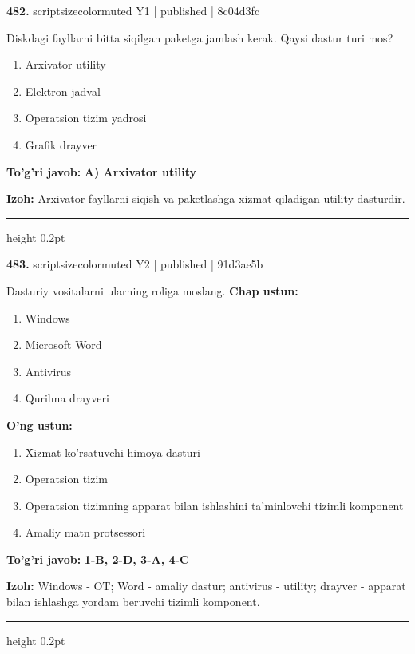 \documentclass[10pt,a4paper]{article}
\begin{document}
{\bfseries\sffamily\color{ink} 482.} {scriptsizecolor{muted} Y1 | published | 8c04d3fc}
\par
Diskdagi fayllarni bitta siqilgan paketga jamlash kerak. Qaysi dastur turi mos?
\begin{enumerate}[label=\Alph*),leftmargin=9mm]
\item Arxivator utility
\item Elektron jadval
\item Operatsion tizim yadrosi
\item Grafik drayver
\end{enumerate}
\begin{tcolorbox}[enhanced,breakable,colback=teal!4,colframe=teal!60!black,boxrule=0.45pt,arc=1.2mm,left=2.7mm,right=2.7mm,top=1.8mm,bottom=1.8mm,before skip=2mm,after skip=2mm]
{\bfseries\sffamily\color{teal}To'g'ri javob:} \textbf{A) Arxivator utility}
\par\smallskip
{\bfseries Izoh:} Arxivator fayllarni siqish va paketlashga xizmat qiladigan utility dasturdir.
\end{tcolorbox}
\vspace{2mm}\hrule height 0.2pt\vspace{3mm}

{\bfseries\sffamily\color{ink} 483.} {scriptsizecolor{muted} Y2 | published | 91d3ae5b}
\par
Dasturiy vositalarni ularning roliga moslang.
\textbf{Chap ustun:}
\begin{enumerate}[label=\arabic*),leftmargin=9mm]
\item Windows
\item Microsoft Word
\item Antivirus
\item Qurilma drayveri
\end{enumerate}
\textbf{O'ng ustun:}
\begin{enumerate}[label=\Alph*),leftmargin=9mm]
\item Xizmat ko'rsatuvchi himoya dasturi
\item Operatsion tizim
\item Operatsion tizimning apparat bilan ishlashini ta'minlovchi tizimli komponent
\item Amaliy matn protsessori
\end{enumerate}
\begin{tcolorbox}[enhanced,breakable,colback=teal!4,colframe=teal!60!black,boxrule=0.45pt,arc=1.2mm,left=2.7mm,right=2.7mm,top=1.8mm,bottom=1.8mm,before skip=2mm,after skip=2mm]
{\bfseries\sffamily\color{teal}To'g'ri javob:} \textbf{1-B, 2-D, 3-A, 4-C}
\par\smallskip
{\bfseries Izoh:} Windows - OT; Word - amaliy dastur; antivirus - utility; drayver - apparat bilan ishlashga yordam beruvchi tizimli komponent.
\end{tcolorbox}
\vspace{2mm}\hrule height 0.2pt\vspace{3mm}
\end{document}
